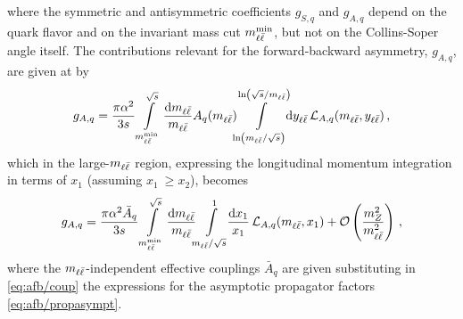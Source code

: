 where the symmetric and antisymmetric coefficients $g_{S,q}$ and $g_{A,q}$ depend on the quark flavor
and on the invariant mass cut $m_{\ell\bar{\ell}}^{\text{min}}$, but not on the
Collins-Soper angle itself.
%
The contributions relevant for the forward-backward asymmetry, $g_{A,q}$,
are given at \lo by
\begin{equation}
\label{eq:afb/gAq_integrated_1}
g_{A,q} =\frac{\pi \alpha^2}{3 s} \int\limits_{m_{\ell\bar{\ell}}^{\text{min}}}^{\sqrt s}\frac{\dd m_{\ell\bar{\ell}}}{m_{\ell\bar{\ell}}}A_{q}(m_{\ell\bar{\ell}})\!\!\int\limits_{\ln(m_{\ell\bar{\ell}}/\sqrt s)}^{\ln(\sqrt s/m_{\ell\bar{\ell}})}\!\!\dd y_{\ell\bar{\ell}}\, \mathcal{L}_{A,q}(m_{\ell\bar{\ell}},y_{\ell\bar{\ell}}) \, ,
\end{equation}
which in the large-$m_{\ell\bar{\ell}}$ region,
 expressing the longitudinal momentum integration in terms of
$x_1$ (assuming $x_1~\ge x_2$), becomes
\begin{equation}
  g_{A,q} = \frac{\pi \alpha^2\bar A_q}{3 s} \int\limits_{m_{\ell\bar{\ell}}^{\text{min}}}^{\sqrt s}\frac{\dd m_{\ell\bar{\ell}}}{m_{\ell\bar{\ell}}}
  \!\!\int\limits_{m_{\ell\bar{\ell}}/\sqrt s}^{1}\!\!\frac{\text{d}x_1}{x_1}\, 
  \mathcal{L}_{A,q}(m_{\ell\bar{\ell}},x_1)+\mathcal{O} \left(\frac{m_Z^2}{m_{\ell\bar{\ell}}^2}\right) \, ,
  \label{eq:afb/gAq_integrated}
\end{equation}
where the $m_{\ell\bar{\ell}}$-independent effective couplings $\bar A_q$  are
given substituting in \cref{eq:afb/coup} the expressions for
the asymptotic propagator factors \cref{eq:afb/propasympt}.

